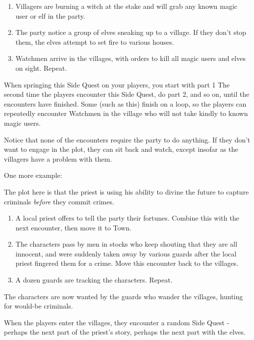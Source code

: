 \begin{multicols}{2}
\begin{enumerate}
\item{Villagers are burning a witch at the stake and will grab any known magic user or elf in the party.}

\item{The party notice a group of elves sneaking up to a village. If they don't stop them, the elves attempt to set fire to various houses.}

\item{Watchmen arrive in the villages, with orders to kill all magic users and elves on sight. Repeat.}

\end{enumerate}

When springing this Side Quest on your players, you start with part 1
The second time the players encounter this Side Quest, do part 2, and so on, until the encounters have finished.
Some (such as this) finish on a loop, so the players can repeatedly encounter Watchmen in the village who will not take kindly to known magic users.

Notice that none of the encounters require the party to do anything.
If they don't want to engage in the plot, they can sit back and watch, except insofar as the villagers have a problem with them.

One more example:

The plot here is that the priest is using his ability to divine the future to capture criminals \emph{before} they commit crimes.

\begin{enumerate}

\item{A local priest offers to tell the party their fortunes.  Combine this with the next encounter, then move it to Town.}

\item{The characters pass by men in stocks who keep shouting that they are all innocent, and were suddenly taken away by various guards after the local priest fingered them for a crime.  Move this encounter back to the villages.}

\item{A dozen guards are tracking the characters. Repeat.}

\end{enumerate}

The characters are now wanted by the guards who wander the villages, hunting for would-be criminals.

When the players enter the villages, they encounter a random Side Quest - perhaps the next part of the priest's story, perhaps the next part with the elves.


\end{multicols}

